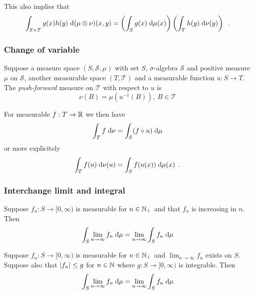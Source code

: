 This also implies that
\begin{equation}
\int_{S \times T} g(x)h(y) \; \text{d}(\mu \otimes \nu)(x, y) = \left(\int_S g(x) \; \text{d} \mu(x)\right) \left(\int_T h(y) \; \text{d} \nu(y)\right) \enspace .
\end{equation}


\subsubsection{Change of variable}\label{secpre:changeOfVar}

Suppose a measure space $(S, \mathscr{S}, \mu)$ with set $S$, $\sigma$-algebra $\mathscr{S}$ and positive measure $\mu$ on $\mathscr{S}$, another measurable space $(T, \mathscr{T})$ and a measurable function $u : S \to T$. 
The \emph{push-forward} measure on $\mathscr{T}$ with respect to $u$ is
\begin{equation}
\nu(B) = \mu(u^{-1}(B)), \ B \in \mathscr{T}
\end{equation}

For measurable $f : T \to \mathbb{R}$ we then have
\begin{equation}
\int_T f \; \text{d} \nu = \int_S (f \circ u) \; \text{d} \mu
\end{equation}
or more explicitely
\begin{equation}
\int_T f(u) \; \text{d} \nu(u) = \int_S f(u(x)) \; \text{d} \mu(x) \enspace .
\end{equation}

\subsubsection{Interchange limit and integral}

\begin{theorem}
Suppose $f_n : S \to [0, \infty)$ is measurable for $n \in \mathbb{N}_+$ and that $f_n$ is increasing in $n$. Then
\begin{equation}
\int_S \lim_{n \to \infty} f_n \; \text{d} \mu = \lim_{n \to \infty} \int_S f_n \; \text{d} \mu
\end{equation}
\end{theorem}

\begin{theorem}
Suppose $f_n : S \to [0, \infty)$ is measurable for $n \in \mathbb{N}_+$ and $\lim_{n \to \infty} f_n$ exists on $S$. Suppose also that $\lvert f_n \rvert \leq g$ for $n \in \mathbb{N}$ where $g : S \to [0, \infty)$ is integrable. Then
\begin{equation}
\int_S \lim_{n \to \infty} f_n \; \text{d} \mu = \lim_{n \to \infty} \int_S f_n \; \text{d} \mu
\end{equation}
\end{theorem}



